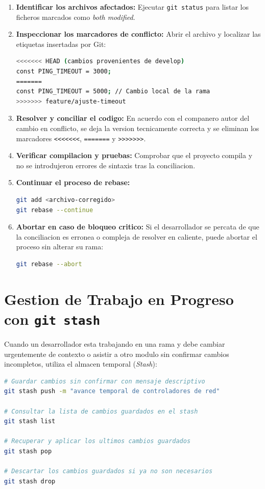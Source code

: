 \documentclass[12pt,a4paper]{report}
\begin{document}
\begin{enumerate}
  \item \textbf{Identificar los archivos afectados:} Ejecutar \texttt{git status} para listar los ficheros marcados como \textit{both modified}.
  \item \textbf{Inspeccionar los marcadores de conflicto:} Abrir el archivo y localizar las etiquetas insertadas por Git:
\begin{lstlisting}[language=bash]
<<<<<<< HEAD (cambios provenientes de develop)
const PING_TIMEOUT = 3000;
=======
const PING_TIMEOUT = 5000; // Cambio local de la rama
>>>>>>> feature/ajuste-timeout
\end{lstlisting}
  \item \textbf{Resolver y conciliar el codigo:} En acuerdo con el companero autor del cambio en conflicto, se deja la version tecnicamente correcta y se eliminan los marcadores \texttt{<<<<<<<}, \texttt{=======} y \texttt{>>>>>>>}.
  \item \textbf{Verificar compilacion y pruebas:} Comprobar que el proyecto compila y no se introdujeron errores de sintaxis tras la conciliacion.
  \item \textbf{Continuar el proceso de rebase:}
\begin{lstlisting}[language=bash]
git add <archivo-corregido>
git rebase --continue
\end{lstlisting}
  \item \textbf{Abortar en caso de bloqueo critico:} Si el desarrollador se percata de que la conciliacion es erronea o compleja de resolver en caliente, puede abortar el proceso sin alterar su rama:
\begin{lstlisting}[language=bash]
git rebase --abort
\end{lstlisting}
\end{enumerate}

\section{Gestion de Trabajo en Progreso con \texttt{git stash}}
Cuando un desarrollador esta trabajando en una rama y debe cambiar urgentemente de contexto o asistir a otro modulo sin confirmar cambios incompletos, utiliza el almacen temporal (\textit{Stash}):

\begin{lstlisting}[language=bash]
# Guardar cambios sin confirmar con mensaje descriptivo
git stash push -m "avance temporal de controladores de red"

# Consultar la lista de cambios guardados en el stash
git stash list

# Recuperar y aplicar los ultimos cambios guardados
git stash pop

# Descartar los cambios guardados si ya no son necesarios
git stash drop
\end{lstlisting}
\end{document}
